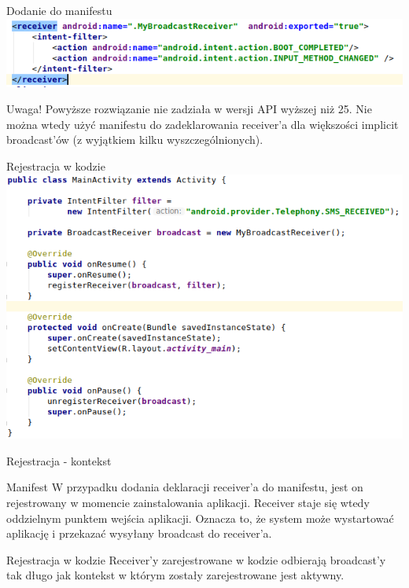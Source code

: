\documentclass{beamer}
\begin{document}
\begin{frame}{Dodanie do manifestu}
	\includegraphics[width=\textwidth]{manifest}
	\begin{block}{Uwaga!}
		Powyższe rozwiązanie nie zadziała w wersji API wyższej niż 25. Nie można wtedy użyć manifestu do zadeklarowania receiver'a dla większości implicit broadcast'ów (z wyjątkiem kilku wyszczególnionych).
	\end{block}
\end{frame}

\begin{frame}{Rejestracja w kodzie}
	\centering
	\includegraphics[height=0.7\textheight]{code-registration}
\end{frame}

\begin{frame}{Rejestracja - kontekst}
	\begin{block}{Manifest}
		W przypadku dodania deklaracji receiver'a do manifestu, jest on rejestrowany w momencie zainstalowania aplikacji. Receiver staje się wtedy oddzielnym punktem wejścia aplikacji. Oznacza to, że system może wystartować aplikację i przekazać wysyłany broadcast do receiver'a.
	\end{block}
	\begin{block}{Rejestracja w kodzie}
		Receiver'y zarejestrowane w kodzie odbierają broadcast'y tak długo jak kontekst w którym zostały zarejestrowane jest aktywny.
	\end{block}
\end{frame}
\end{document}
